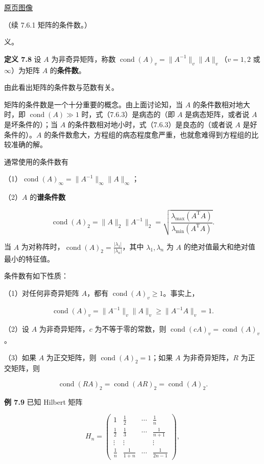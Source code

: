 \documentclass[
  10pt,
  fontset=fandol]{ctexart}
\begin{document}
\href{../../source-images/pdf-207.jpeg}{原页图像}

（续 7.6.1 矩阵的条件数。）

义。

\textbf{定义 7.8} 设 \(A\) 为非奇异矩阵，称数 \(\operatorname{cond}(A)_v=\|A^{-1}\|_v\|A\|_v\)（\(v=1,2\) 或 \(\infty\)）为矩阵 \(A\) 的\textbf{条件数}。

由此看出矩阵的条件数与范数有关。

矩阵的条件数是一个十分重要的概念。由上面讨论知，当 \(A\) 的条件数相对地大时，即 \(\operatorname{cond}(A)\gg1\) 时，式（7.6.3）是病态的（即 \(A\) 是病态矩阵，或者说 \(A\) 是坏条件的）；当 \(A\) 的条件数相对地小时，式（7.6.3）是良态的（或者说 \(A\) 是好条件的）。\(A\) 的条件数愈大，方程组的病态程度愈严重，也就愈难得到方程组的比较准确的解。

通常使用的条件数有

（1）\(\operatorname{cond}(A)_\infty=\|A^{-1}\|_\infty\|A\|_\infty\)；

（2）\(A\) 的\textbf{谱条件数}

\[
\operatorname{cond}(A)_2=\|A\|_2\|A^{-1}\|_2
=\sqrt{\frac{\lambda_{\max}(A^{\mathrm T}A)}{\lambda_{\min}(A^{\mathrm T}A)}}.
\]

当 \(A\) 为对称阵时，\(\operatorname{cond}(A)_2=\frac{|\lambda_1|}{|\lambda_n|}\)，其中 \(\lambda_1,\lambda_n\) 为 \(A\) 的绝对值最大和绝对值最小的特征值。

条件数有如下性质：

（1）对任何非奇异矩阵 \(A\)，都有 \(\operatorname{cond}(A)_v\geqslant1\)。事实上，

\[
\operatorname{cond}(A)_v=\|A^{-1}\|_v\|A\|_v\geqslant\|A^{-1}A\|_v=1.
\]

（2）设 \(A\) 为非奇异矩阵，\(c\) 为不等于零的常数，则 \(\operatorname{cond}(cA)_v=\operatorname{cond}(A)_v\)。

（3）如果 \(A\) 为正交矩阵，则 \(\operatorname{cond}(A)_2=1\)；如果 \(A\) 为非奇异矩阵，\(R\) 为正交矩阵，则

\[
\operatorname{cond}(RA)_2=\operatorname{cond}(AR)_2=\operatorname{cond}(A)_2.
\]

\textbf{例 7.9} 已知 Hilbert 矩阵

\[
H_n=\begin{pmatrix}
1&\frac12&\cdots&\frac1n\\[4pt]
\frac12&\frac13&\cdots&\frac1{n+1}\\
\vdots&\vdots&&\vdots\\
\frac1n&\frac1{1+n}&\cdots&\frac1{2n-1}
\end{pmatrix},
\]
\end{document}
